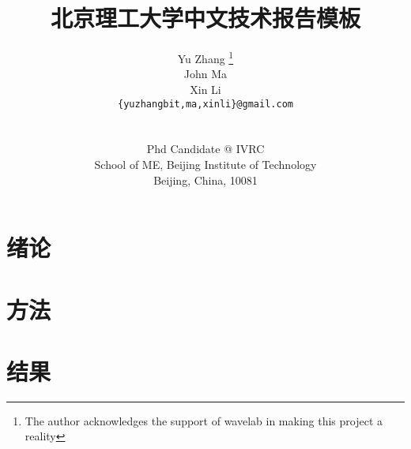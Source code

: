 \documentclass[11pt,a4paper]{ctexart}
\title{北京理工大学中文技术报告模板}
\author{Yu Zhang
	\thanks{The author acknowledges the support of wavelab in
		making this project a reality}\\
	John Ma\\
	Xin Li\\
	{\tt{\{yuzhangbit,ma,xinli\}@gmail.com}}\\
	\\\\
	Phd Candidate @ IVRC \\
	School of ME, Beijing Institute of Technology \\
	Beijing, China, 10081\\
}
\begin{document}
\makecover
\maketitle
	
\section{绪论}

\section{方法}

\section{结果}

	
\end{document}
